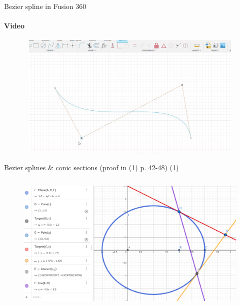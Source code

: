 \documentclass[aspectratio=169]{beamer}
\begin{document}
\begin{frame}[t]{Bezier spline in Fusion 360}
    \framesubtitle{Video}
    \vspace{-0.6cm}
    \begin{figure}[H]
            \href{https://disk.yandex.ru/i/n3g2fF4qWvhTcA}{
            \centering\includegraphics[height=6cm,width=1\textwidth,keepaspectratio]{bezier_spline_video_preview.jpg}}
    \end{figure}
\end{frame}

\begin{frame}[t]{Bezier splines \& conic sections (proof in (1) p. 42-48) (1)}
\framesubtitle{}
\vspace{-0.5cm}
            \begin{figure}[H]
                \centering\includegraphics[height=6.5cm,width=1\textwidth,keepaspectratio]{bezier_to_conic_intro.png}
                \label{fig:bezier_to_conic_intro.png}
            \end{figure}
\end{frame}
\end{document}

